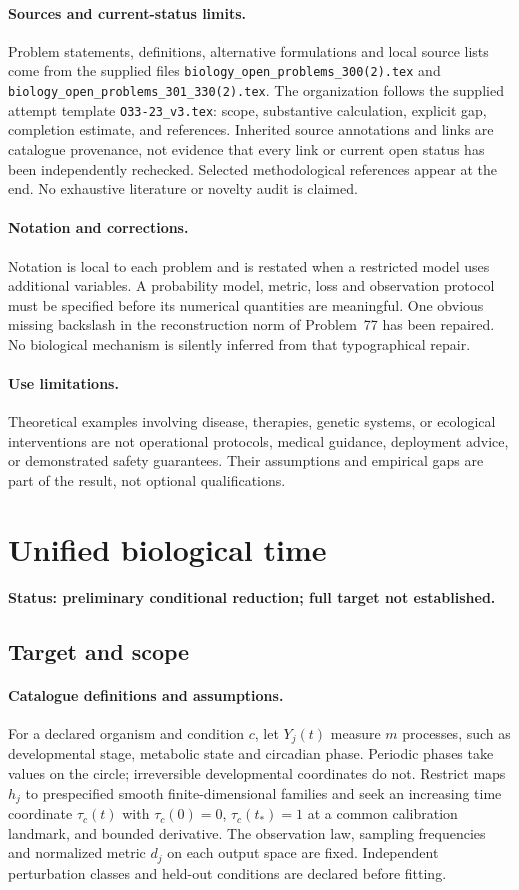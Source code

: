 \documentclass[11pt]{article}
\begin{document}
\paragraph{Sources and current-status limits.}
Problem statements, definitions, alternative formulations and local source lists
come from the supplied files
\texttt{biology\_open\_problems\_300(2).tex} and
\texttt{biology\_open\_problems\_301\_330(2).tex}.
The organization follows the supplied attempt template
\texttt{O33-23\_v3.tex}: scope, substantive calculation, explicit gap,
completion estimate, and references. Inherited source annotations and links are
catalogue provenance, not evidence that every link or current open status has
been independently rechecked. Selected methodological references appear at the
end. No exhaustive literature or novelty audit is claimed.

\paragraph{Notation and corrections.}
Notation is local to each problem and is restated when a restricted model uses
additional variables. A probability model, metric, loss and observation protocol
must be specified before its numerical quantities are meaningful. One obvious
missing backslash in the reconstruction norm of Problem~77 has been repaired.
No biological mechanism is silently inferred from that typographical repair.

\paragraph{Use limitations.}
Theoretical examples involving disease, therapies, genetic systems, or ecological
interventions are not operational protocols, medical guidance, deployment advice,
or demonstrated safety guarantees. Their assumptions and empirical gaps are part
of the result, not optional qualifications.


\section*{Unified biological time}
\label{prob:302}
\noindent\textbf{Status: preliminary conditional reduction; full target not established.}
\subsection{Target and scope}
\paragraph{Catalogue definitions and assumptions.}
For a declared organism and condition $c$, let $Y_j(t)$ measure $m$ processes, such as developmental stage, metabolic state and circadian phase. Periodic phases take values on the circle; irreversible developmental coordinates do not. Restrict maps $h_j$ to prespecified smooth finite-dimensional families and seek an increasing time coordinate $\tau_c(t)$ with $\tau_c(0)=0$, $\tau_c(t_*)=1$ at a common calibration landmark, and bounded derivative. The observation law, sampling frequencies and normalized metric $d_j$ on each output space are fixed. Independent perturbation classes and held-out conditions are declared before fitting.
\end{document}
